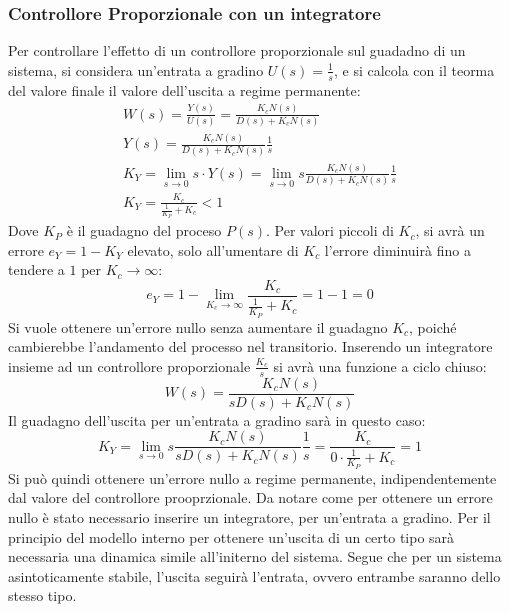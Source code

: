 \documentclass{article}
\numberwithin{equation}{subsection}
\begin{document}
\subsubsection{Controllore Proporzionale con un integratore}
Per controllare l'effetto di un controllore proporzionale sul guadadno di un sistema, si considera un'entrata a gradino $U(s)=\displaystyle\frac{1}{s}$, e si calcola con 
il teorma del valore finale il valore dell'uscita a regime permanente:
\begin{gather}
    W(s)=\displaystyle\frac{Y(s)}{U(s)}=\frac{K_cN(s)}{D(s)+K_cN(s)}\\
    Y(s)=\displaystyle\frac{K_c N(s)}{D(s)+K_c N(s)}\frac{1}{s}\\
    K_Y=\lim_{s\to0}s\cdot Y(s)=\lim_{s\to0}s\displaystyle\frac{K_c N(s)}{D(s)+K_c N(s)}\frac{1}{s}\\
    K_Y=\displaystyle\frac{K_c}{\displaystyle\frac{1}{K_P}+K_c}<1
\end{gather}
Dove $K_P$ è il guadagno del proceso $P(s)$. Per valori piccoli di $K_c$, si avrà un errore $e_Y=1-K_Y$ elevato, solo all'umentare di $K_c$ l'errore diminuirà fino a tendere 
a $1$ per $K_c\to\infty$: 
\begin{equation}
    e_Y=1-\lim_{K_c\to\infty}\displaystyle\frac{K_c}{\displaystyle\frac{1}{K_P}+K_c}=1-1=0
\end{equation}
Si vuole ottenere un'errore nullo senza aumentare il guadagno $K_c$, poiché cambierebbe l'andamento del processo nel transitorio. Inserendo un integratore insieme ad 
un controllore proporzionale $\displaystyle\frac{K_c}{s}$ si avrà una funzione a ciclo chiuso:
\begin{equation}
    W(s)=\displaystyle\frac{K_cN(s)}{sD(s)+K_cN(s)}
\end{equation}
Il guadagno dell'uscita per un'entrata a gradino sarà in questo caso:
\begin{equation}
    K_Y=\lim_{s\to0}s\displaystyle\frac{K_c N(s)}{sD(s)+K_c N(s)}\frac{1}{s}=\frac{K_c}{0\cdot\displaystyle\frac{1}{K_P}+K_c}=1
\end{equation}
Si può quindi ottenere un'errore nullo a regime permanente, indipendentemente dal valore del controllore prooprzionale. Da notare come per ottenere un errore nullo è stato 
necessario inserire un integratore, per un'entrata a gradino. Per il principio del modello interno per ottenere un'uscita di un certo tipo sarà necessaria una dinamica 
simile all'initerno del sistema. Segue che per un sistema asintoticamente stabile, l'uscita seguirà l'entrata, ovvero entrambe saranno dello stesso tipo. 
\end{document}
